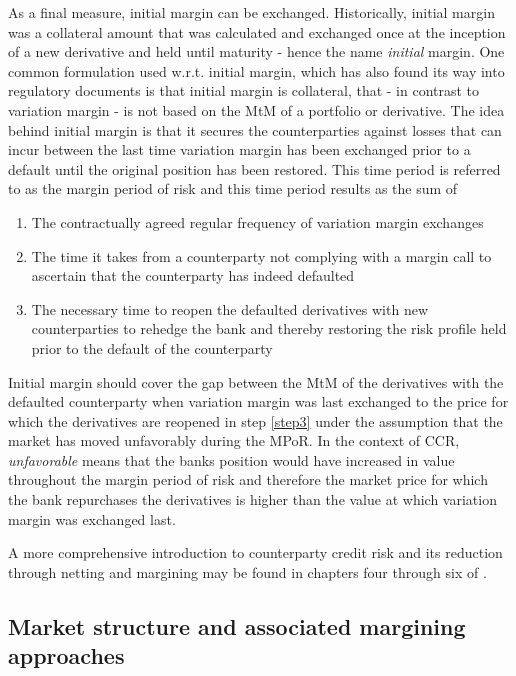 \documentclass[../Thesis_AHoecherl.tex]{subfiles}
\begin{document}
As a final measure, initial margin can be exchanged. Historically, initial margin was a collateral amount that was calculated and exchanged once at the inception of a new derivative and held until maturity - hence the name \emph{initial} margin. One common formulation used w.r.t. initial margin, which has also found its way into regulatory documents  is that initial margin is collateral, that - in contrast to variation margin - is not based on the \gls{MtM} of a portfolio or derivative. The idea behind initial margin is that it secures the counterparties against losses that can incur between the last time variation margin has been exchanged prior to a default until the original position has been restored. This time period is referred to as the margin period of risk and this time period results as the sum of
\begin{enumerate}
    \item The contractually agreed regular frequency of variation margin exchanges
    \item The time it takes from a counterparty not complying with a margin call to ascertain that the counterparty has indeed defaulted
    \item The necessary time to reopen the defaulted derivatives with new counterparties to rehedge the bank and thereby restoring the risk profile held prior to the default of the counterparty\label{step3}
\end{enumerate}
Initial margin should cover the gap between the \gls{MtM} of the derivatives with the defaulted counterparty when variation margin was last exchanged to the price for which the derivatives are reopened in step \ref{step3} under the assumption that the market has moved unfavorably during the \gls{MPoR}. In the context of CCR, \emph{unfavorable} means that the banks position would have increased in value throughout the margin period of risk and therefore the market price for which the bank repurchases the derivatives is higher than the value at which variation margin was exchanged last.

A more comprehensive introduction to counterparty credit risk and its reduction through netting and margining may be found in chapters four through six of \cite{gregory2015xva}.

\subsection{Market structure and associated margining approaches}
\end{document}
